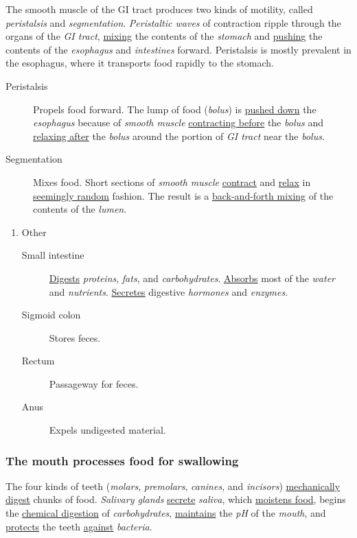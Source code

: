 \documentclass[11pt]{article}
\begin{document}
The smooth muscle of the GI tract produces two kinds of motility, called
\emph{peristalsis} and \emph{segmentation}. \emph{Peristaltic waves} of contraction ripple through
the organs of the \emph{GI tract}, \uline{mixing} the contents of the \emph{stomach} and \uline{pushing} the
contents of the \emph{esophagus} and \emph{intestines} forward. Peristalsis is mostly
prevalent in the esophagus, where it transports food rapidly to the stomach.

\begin{description}
\item[{Peristalsis}] Propels food forward. The lump of food (\emph{bolus}) is \uline{pushed down}
the \emph{esophagus} because of \emph{smooth muscle} \uline{contracting before} the \emph{bolus} and
\uline{relaxing after} the \emph{bolus} around the portion of \emph{GI tract} near the \emph{bolus}.
\item[{Segmentation}] Mixes food. Short sections of \emph{smooth muscle} \uline{contract} and \uline{relax}
in \uline{seemingly random} fashion. The result is a \uline{back-and-forth mixing} of the
contents of the \emph{lumen}.
\end{description}

\begin{enumerate}
\item Other
\label{sec:orge5dd3f2}
\begin{description}
\item[{Small intestine}] \uline{Digests} \emph{proteins}, \emph{fats}, and \emph{carbohydrates}. \uline{Absorbs} most of
the \emph{water} and \emph{nutrients}. \uline{Secretes} digestive \emph{hormones} and \emph{enzymes}.
\item[{Sigmoid colon}] Stores feces.
\item[{Rectum}] Passageway for feces.
\item[{Anus}] Expels undigested material.
\end{description}
\end{enumerate}

\subsubsection{The mouth processes food for swallowing}
\label{sec:orgcecf9b6}
The four kinds of teeth (\emph{molars}, \emph{premolars}, \emph{canines}, and \emph{incisors}) \uline{mechanically
digest} chunks of food. \emph{Salivary glands} \uline{secrete} \emph{saliva}, which \uline{moistens food},
begins the \uline{chemical digestion} of \emph{carbohydrates}, \uline{maintains} the \emph{pH} of the \emph{mouth},
and \uline{protects} the teeth \uline{against} \emph{bacteria}.
\end{document}
